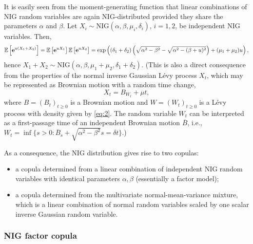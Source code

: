 It is easily seen from the moment-generating function that linear
combinations of NIG random variables are again NIG-distributed
provided they share the parameters $\alpha$ and $\beta$. Let $X_i\sim
\text{NIG}(\alpha, \beta, \mu_i, \delta_i)$, $i=1,2$, be
independent NIG variables. Then, 
\begin{equation*}
  {\mathbb{E}}\left[{\bf e}^{u(X_1+X_2)}\right] = {\mathbb{E}}\left[{\bf e}^{u X_1}\right]
  {\mathbb{E}}\left[{\bf e}^{u X_2}\right] = \exp\left((\delta_1+\delta_2)
    \left(\sqrt{\alpha^2-\beta^2} - \sqrt{\alpha^2 -
        (\beta+u)^2}\right) + (\mu_1+\mu_2) u\right),
\end{equation*}
hence $X_1+X_2\sim \text{NIG}(\alpha, \beta, \mu_1+\mu_2,
\delta_1+\delta_2)$. (This is also a direct consequence from the
properties of 
the normal inverse Gaussian L\'evy process $X_t$, which may be
represented as Brownian motion with a random time change,
\begin{equation*}
  X_t = B_{W_t} + \mu t,
\end{equation*}
where $B=(B_t)_{t\geq 0}$ is a Brownian motion and $W=(W_t)_{t\geq 0}$
is a L\'evy process with density given by \eqref{eq:2}. The random
variable $W_t$ can be interpreted as a first-passage time of an
independent Brownian motion $\overline B$, i.e., $W_t=\inf\{s>0:
\overline B_s + \sqrt{\alpha^2-\beta^2}s = \delta t\}$.)

As a consequence, the NIG distribution gives rise to two copulas:
\begin{itemize}
\item a copula determined from a linear combination of independent NIG
  random variables with identical parameters $\alpha, \beta$
  (essentially a factor model);
\item a copula determined from the multivariate normal-mean-variance
  mixture, which is a linear combination of normal random variables
  scaled by one scalar inverse Gaussian random variable.
\end{itemize}

\subsubsection{NIG factor copula}
\label{sec:nig-factor-copula}

